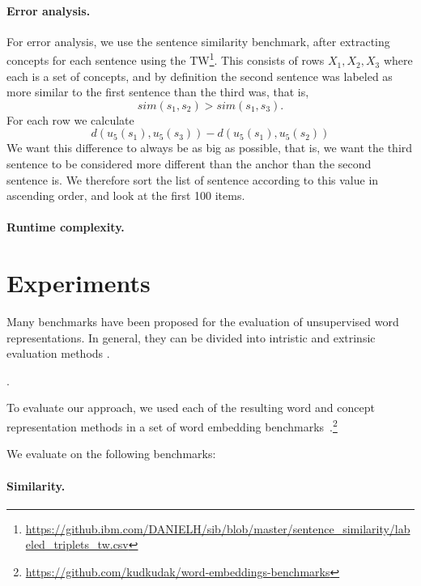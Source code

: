 \documentclass{article}
\begin{document}
    \paragraph{Error analysis.}
    For error analysis, we use the sentence similarity benchmark,
    after extracting concepts for each sentence using the
    TW\footnote{\url{https://github.ibm.com/DANIELH/sib/blob/master/sentence_similarity/labeled_triplets_tw.csv}}.
    This consists of rows $X_1,X_2,X_3$ where each is a set of concepts,
    and by definition the second sentence was labeled as more similar to the first
    sentence than the third was, that is,
    \[
        sim(s_1,s_2)>sim(s_1,s_3).
    \]
    For each row we calculate
    \[
        d(u_5(s_1),u_5(s_3)) - d(u_5(s_1),u_5(s_2))
    \]
    We want this difference to always be as big as possible,
    that is, we want the third sentence to be considered more different than
    the anchor than the second sentence is.
    We therefore sort the list of sentence according to this value
    in ascending order, and look at the first 100 items.

    \paragraph{Runtime complexity.}



    \section{Experiments}\label{sec:experiments}

    Many benchmarks have been proposed for the evaluation of unsupervised word
    representations.
    In general, they can be divided into intristic and extrinsic evaluation methods \cite{schnabel2015evaluation,jastrzebski2017evaluate}.

    \cite{hill2015simlex,avraham2016improving}.

    To evaluate our approach, we used each of the resulting word and concept
    representation methods in a set of word embedding benchmarks~\cite{jastrzebski2017evaluate}.\footnote{\url{https://github.com/kudkudak/word-embeddings-benchmarks}}
    
    We evaluate on the following benchmarks:
    
    \paragraph{Similarity.}
    
\end{document}
